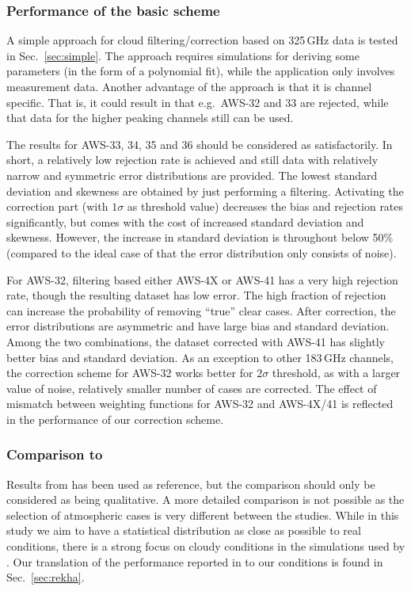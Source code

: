 \documentclass[12pt]{article}
\begin{document}
\subsubsection{Performance of the basic scheme}
%
A simple approach for cloud filtering/correction based on 325\,GHz data is
tested in Sec.~\ref{sec:simple}. The approach requires simulations for deriving
some parameters (in the form of a polynomial fit), while the application only
involves measurement data. Another advantage of the approach is that it is
channel specific. That is, it could result in that e.g.\ AWS-32 and 33 are
rejected, while that data for the higher peaking channels still can be used.

The results for AWS-33, 34, 35 and 36 should be considered as satisfactorily.
In short, a relatively low rejection rate is achieved and still data with
relatively narrow and symmetric error distributions are provided. The lowest
standard deviation and skewness are obtained by just performing a filtering.
Activating the correction part (with $1\sigma$ as threshold value) decreases
the bias and rejection rates significantly, but comes with the cost of
increased standard deviation and skewness. However, the increase in standard
deviation is throughout below 50\% (compared to the ideal case of that the
error distribution only consists of noise). 

For AWS-32, filtering based either AWS-4X or AWS-41 has a very high rejection rate, though the resulting dataset has low error. The high fraction of rejection can increase the probability of removing ``true'' clear cases. After correction, the error distributions are asymmetric and have large bias and standard deviation. Among the two combinations, the dataset corrected with AWS-41 has slightly better bias and standard deviation. As an exception to other 183\,GHz channels, the correction scheme for AWS-32 works better for $2\sigma$ threshold, as with a larger value of noise, relatively smaller number of cases are corrected. The effect of mismatch between weighting functions for AWS-32 and AWS-4X/41 is reflected in the performance of our correction scheme.

\subsubsection{Comparison to \citet{rekha2012potential}}
%
Results from \citet{rekha2012potential} has been used as reference, but the
comparison should only be considered as being qualitative. A more detailed
comparison is not possible as the selection of atmospheric cases is very
different between the studies. While in this study we aim to have a statistical
distribution as close as possible to real conditions, there is a strong focus on
cloudy conditions in the simulations used by \citet{rekha2012potential}. Our
translation of the performance reported in \citet{rekha2012potential} to our
conditions is found in Sec.~\ref{sec:rekha}.
\end{document}
